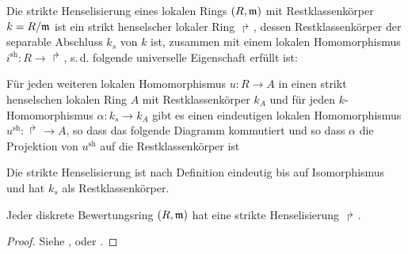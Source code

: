 
\begin{Definition}\label{def:striktehenselisierung}
  Die strikte Henselisierung eines lokalen Rings $(R,\mathfrak{m})$ mit
  Restklassenkörper $k=R/\mathfrak{m}$ ist ein strikt henselscher lokaler Ring
  $\Rsh$, dessen Restklassenkörper der separable Abschluss $k_s$ von
  $k$ ist, zusammen mit einem lokalen Homomorphismus
  $i^\text{sh}\colon R\to\Rsh$, s.\,d. folgende universelle
  Eigenschaft erfüllt ist:
  
  Für jeden weiteren lokalen Homomorphismus $u\colon R\to A$ in einen
  strikt henselschen lokalen Ring $A$ mit Restklassenkörper $k_A$ und
  für jeden $k$-Homomorphismus $\alpha\colon k_s\to k_A$ gibt es einen
  eindeutigen lokalen Homomorphismus $u^\text{sh}\colon\Rsh\to A$, so
  dass das folgende Diagramm kommutiert und so dass $\alpha$ die
  Projektion von $u^\text{sh}$ auf die Restklassenkörper ist
  \begin{center}
  \end{center}

  Die strikte Henselisierung ist nach Definition eindeutig bis auf
  Isomorphismus und hat $k_s$ als Restklassenkörper.
\end{Definition}

\begin{Satz}
  \label{thm:exhenselisierung}
  Jeder diskrete Bewertungsring $(R,\mathfrak{m})$ hat eine
  strikte Henselisierung $\Rsh$.
  \begin{proof}
    Siehe
    \cite[Proposition IV.6.5]{silverman2},
    \cite[Remark IV.6.6.2]{silverman2}
    oder \cite[Chapter 2.3, S. 48]{neron}.
  \end{proof}
\end{Satz}

